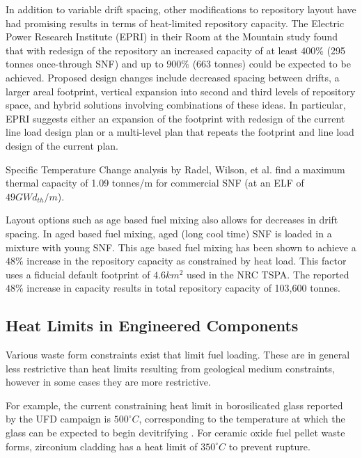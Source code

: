 In addition to variable drift spacing, other modifications to repository layout
have had promising results in terms of heat-limited repository capacity. The
Electric Power Research Institute (EPRI) in their Room at the Mountain study
found that with redesign of the repository an increased capacity of at least
$400\%$ (295 tonnes once-through SNF) and up to $900\%$ (663 tonnes) could be
expected to be achieved. Proposed design changes include decreased spacing
between drifts, a larger areal footprint, vertical expansion into second and
third levels of repository space, and hybrid solutions involving combinations
of these ideas. In particular, EPRI suggests either an expansion of the
footprint with redesign of the current line load design plan or a
multi-level plan that repeats the footprint and line load design of the current
plan\cite{kessler_room_2006}.

Specific Temperature Change analysis by Radel, Wilson, et al. find a maximum
thermal capacity of 1.09 tonnes/m for commercial SNF (at an ELF of $49
GWd_{th}/m$)\cite{radel_effect_2007}. 

Layout options such as age based fuel mixing also allows for decreases in drift 
spacing. In aged based fuel mixing, aged (long cool time) SNF is loaded in a 
mixture with young SNF. This age based fuel mixing has been shown to achieve a 
$48\%$ increase in the repository capacity as constrained by heat
load\cite{nicholson_thermal_2007}. This factor uses a fiducial default
footprint of $4.6 km^2$ used in the NRC TSPA.  The reported $48\%$ increase in
capacity results in total repository capacity of 103,600
tonnes\cite{williams_total_2001}.


 


\subsection{Heat Limits in Engineered Components} 

Various waste form constraints exist that limit fuel loading. These are 
in general less restrictive than heat limits resulting from geological medium 
constraints, however in some cases they are more restrictive. 

For example, the current constraining heat limit in borosilicated glass 
reported by the \gls{UFD} campaign is $500^{\circ}C$, corresponding to the 
temperature at which the glass can be expected to begin devitrifying 
\cite{carter_disposal_2010, hardin_generic_2011, soelberg_heat_2009}. For ceramic oxide 
fuel pellet waste forms, zirconium cladding has a heat limit of $350^{\circ}C$ 
to prevent rupture. 

